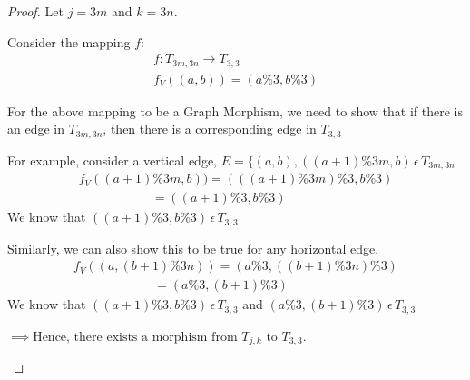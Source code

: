 \documentclass{article}
\begin{document}
\begin{proof}
    Let $j = 3m$ and $k = 3n$.
    
    Consider the mapping $f$: \\
    \begin{gather*}
        f: T_{3m, 3n} \rightarrow T_{3,3} \\
        f_V((a, b)) = (a \% 3, b \% 3)
    \end{gather*}
    
    For the above mapping to be a Graph Morphism, we need to show that if there is an edge in $T_{3m,3n}$, then there is a corresponding edge in $T_{3,3}$
   
    For example, consider a vertical edge, $E = \{(a,b), ((a+1)\%3m, b) \hspace{2pt} \epsilon \hspace{2pt} T_{3m, 3n}$
    \begin{gather*}
    f_V((a+1)\%3m, b)) = (((a+1)\%3m)\% 3, b \% 3) \\
    \phantom{xxxxxxxxxx} = ((a+1)\% 3, b \% 3)
    \end{gather*}
    We know that $((a+1)\% 3, b \% 3) \hspace{2pt} \epsilon \hspace{2pt} T_{3, 3}$
    
    Similarly, we can also show this to be true for any horizontal edge. \\
    \begin{gather*}
     f_V((a, (b+1)\%3n)) = (a \% 3, ((b+1)\%3n)\% 3) \\
    \phantom{xxxxxxxxxxx} = (a \% 3, (b+1)\% 3) 
    \end{gather*}
    We know that $((a+1)\% 3, b \% 3) \hspace{2pt} \epsilon \hspace{2pt} T_{3, 3}$ and $(a \% 3, (b+1)\%3) \hspace{2pt} \epsilon \hspace{2pt} T_{3, 3}$
    
    $\implies \text{Hence, there exists a morphism from $T_{j,k}$ to $T_{3,3}$}$.
    
    \begin{center}
    
\end{center}
\end{proof}
\end{document}
